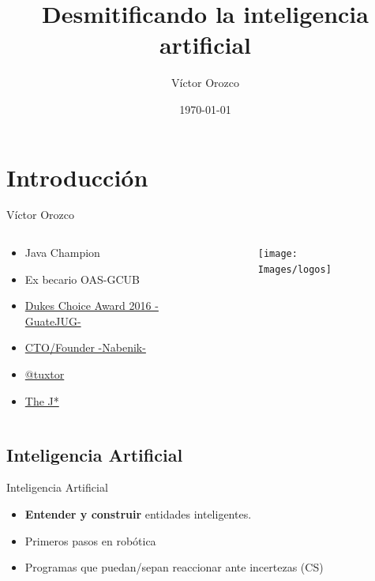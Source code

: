 \documentclass{beamer}
\title{Desmitificando la inteligencia artificial}
\author{Víctor Orozco}
\institute{Nabenik}
\date{\today}
\begin{document}
\frame{\titlepage}

\section{Introducción}


\begin{frame}{Víctor Orozco}
    \begin{columns}[T] %
        \begin{column}[T]{5cm} %
            \begin{itemize}
                \item Java Champion
                \item Ex becario OAS-GCUB
                \item \href{https://www.oracle.com/javaone/dukes-choice-award.html}{Dukes Choice Award 2016 -GuateJUG-}
                \item \href{http://www.nabenik.com}{CTO/Founder -Nabenik-}
                \item \href{https://twitter.com/tuxtor}{@tuxtor}
                \item \href{http://vorozco.com}{The J*} 
            \end{itemize}
        \end{column}
        \begin{column}[T]{3cm} %
            \begin{figure}
                \centering
                \texttt{[image: Images/logos]}
            \end{figure}
            
        \end{column}
    \end{columns}
\end{frame}

\subsection{Inteligencia Artificial}

\begin{frame}{Inteligencia Artificial}
    \begin{itemize}
        \item \textbf{Entender y construir} entidades 
        inteligentes.
        \item Primeros pasos en robótica
        \item Programas que puedan/sepan reaccionar ante incertezas (CS)
    \end{itemize}
\end{frame}
\end{document}
